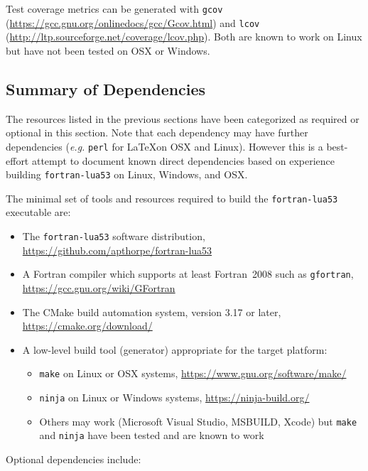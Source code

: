 Test coverage metrics can be generated with \texttt{gcov}
(\url{https://gcc.gnu.org/onlinedocs/gcc/Gcov.html}) and \texttt{lcov}
(\url{http://ltp.sourceforge.net/coverage/lcov.php}). Both are known
to work on Linux but have not been tested on OSX or Windows.

\subsection{Summary of Dependencies}

The resources listed in the previous sections have been categorized as
required or optional in this section. Note that each dependency may have
further dependencies (\textit{e.g.} \texttt{perl} for \LaTeX on OSX and
Linux). However this is a best-effort attempt to document known direct
dependencies based on experience building \texttt{fortran-lua53} on Linux, Windows,
and OSX.

The minimal set of tools and resources required to build the \texttt{fortran-lua53}
executable are:

\begin{itemize}
    \item The \texttt{fortran-lua53} software distribution,
    \url{https://github.com/apthorpe/fortran-lua53}
    \item A Fortran compiler which supports at least Fortran~2008 such
    as \texttt{gfortran}, \url{https://gcc.gnu.org/wiki/GFortran}
    \item The CMake build automation system, version 3.17 or later,
    \url{https://cmake.org/download/}
    \item A low-level build tool (generator) appropriate for the target
    platform:
    \begin{itemize}
        \item \texttt{make} on Linux or OSX systems,
        \url{https://www.gnu.org/software/make/}
        \item \texttt{ninja} on Linux or Windows systems,
        \url{https://ninja-build.org/}
        \item Others may work (Microsoft Visual Studio, MSBUILD, Xcode)
        but \texttt{make} and \texttt{ninja} have been tested and are
        known to work
    \end{itemize}
\end{itemize}

Optional dependencies include:

